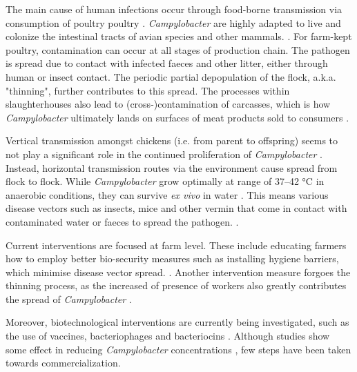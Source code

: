 The main cause of human infections occur through food-borne transmission via consumption of poultry poultry \parencite{wilson_tracing_2008}. \textit{Campylobacter} are highly adapted to live and colonize the intestinal tracts of avian species and other mammals. \parencite{saif_diseases_2008}. For farm-kept poultry, contamination can occur at all stages of production chain. The pathogen is spread due to contact with infected faeces and other litter, either through human or insect contact. The periodic partial depopulation of the flock, a.k.a. "thinning", further contributes to this spread. The processes within slaughterhouses also lead to (cross-)contamination of carcasses, which is how \textit{Campylobacter} ultimately lands on surfaces of meat products sold to consumers \parencite{skarp_campylobacteriosis_2015}.

Vertical transmission amongst chickens (i.e. from parent to offspring) seems to not play a significant role in the continued proliferation of \textit{Campylobacter} \parencite{callicott_lack_2006}. Instead, horizontal transmission routes via the environment cause spread from flock to flock. While \textit{Campylobacter} grow optimally at range of 37–42 °C in anaerobic conditions, they can survive \textit{ex vivo} in water \parencite{wilson_tracing_2008}. This means various disease vectors such as insects, mice and other vermin that come in contact with contaminated water or faeces to spread the pathogen. \parencite{newell_sources_2003}.

Current interventions are focused at farm level. These include educating farmers how to employ better bio-security measures such as installing hygiene barriers, which minimise disease vector spread. \parencite{hansson_knowledge_2018}. Another intervention measure forgoes the thinning process, as the increased of presence of workers also greatly contributes the spread of \textit{Campylobacter} \parencite{lin_novel_2009}. 

Moreover, biotechnological interventions are currently being investigated, such as the use of vaccines, bacteriophages and bacteriocins \parencite{hansson_knowledge_2018}. Although studies show some effect in reducing \textit{Campylobacter} concentrations \parencite{wagenaar_phage_2005}, few steps have been taken towards commercialization. %

